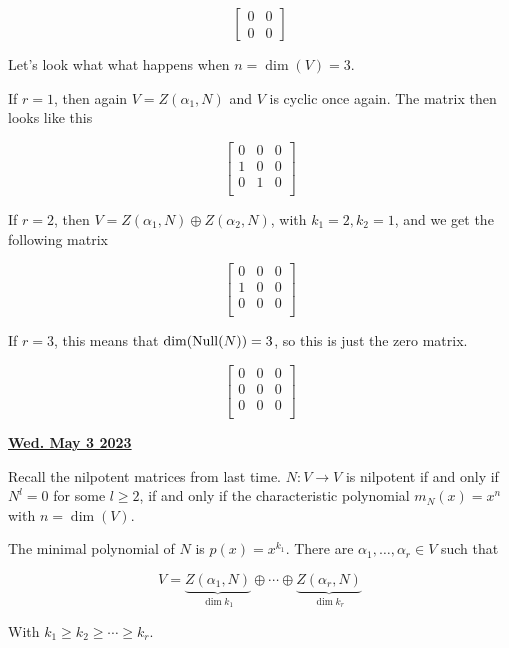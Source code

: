 \documentclass[12pt]{article}
\renewcommand{\date}[1]{\underline{\bf #1}}
\begin{document}
  \[
    \begin{bmatrix}
      0 & 0 \\
      0 & 0
    \end{bmatrix}
  \]

  Let's look what what happens when $n = \dim(V) = 3$.

  If $r = 1$, then again $V = Z(\alpha_1, N)$ and $V$ is cyclic once again. The
  matrix then looks like this

  \[
    \begin{bmatrix}
      0 & 0 & 0 \\
      1 & 0 & 0 \\
      0 & 1 & 0 \\
    \end{bmatrix}
  \]

  If $r = 2$, then $V = Z(\alpha_1, N) \oplus Z(\alpha_2, N)$, with $k_1 = 2,
  k_2 = 1$, and we get the following matrix

  \[
    \begin{bmatrix}
      0 & 0 & 0 \\
      1 & 0 & 0 \\
      0 & 0 & 0 \\
    \end{bmatrix}
  \]

  If $r = 3$, this means that $\dim(\mathrm{Null}(N)) = 3$, so this is just the zero
  matrix.

  \[
    \begin{bmatrix}
      0 & 0 & 0 \\
      0 & 0 & 0 \\
      0 & 0 & 0 \\
    \end{bmatrix}
  \]

  \date{Wed. May 3 2023}


  Recall the nilpotent matrices from last time. $N: V \to V$ is nilpotent if and
  only if $N^l = 0$ for some $l \ge 2$, if and only if the characteristic
  polynomial $m_N(x) = x^n$ with $n = \dim(V)$.

  The minimal polynomial of $N$ is $p(x) = x^{k_1}$. There are $\alpha_1, \dots,
  \alpha_r \in V$ such that

  \[
    V = \underbrace{Z(\alpha_1, N)}_{\dim k_1} \oplus \cdots \oplus
    \underbrace{Z(\alpha_r, N)}_{\dim k_r}
  \]

  With $k_1 \ge k_2 \ge \cdots \ge k_r$.
\end{document}

